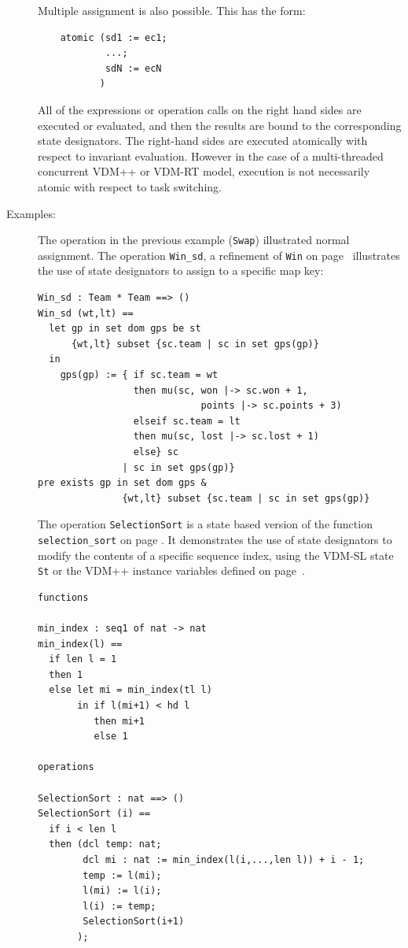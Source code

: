 \documentclass{overturerepchap}
\begin{document}
\begin{description}
  Multiple assignment is also possible. This has the form:
  \begin{lstlisting}
    atomic (sd1 := ec1;
            ...;
            sdN := ecN
           )
  \end{lstlisting}
  All of the expressions or operation calls on the right hand sides
  are executed or evaluated, and then the results are bound to the
  corresponding state designators. The right-hand sides are executed
  atomically with respect to invariant evaluation.  However in the
  case of a multi-threaded concurrent VDM++ or VDM-RT model, execution
  is not necessarily atomic with respect to task switching.

\item[Examples:] The operation in the previous example (\texttt{Swap}) 
  illustrated normal assignment. The operation \texttt{Win\_sd}, a 
  refinement of \texttt{Win} on page~\pageref{winDef} illustrates the use of 
  state designators to assign to a specific map key:
  \begin{lstlisting}
Win_sd : Team * Team ==> ()
Win_sd (wt,lt) ==
  let gp in set dom gps be st 
      {wt,lt} subset {sc.team | sc in set gps(gp)}
  in
    gps(gp) := { if sc.team = wt
                 then mu(sc, won |-> sc.won + 1,
                             points |-> sc.points + 3)
                 elseif sc.team = lt
                 then mu(sc, lost |-> sc.lost + 1)
                 else} sc 
               | sc in set gps(gp)}
pre exists gp in set dom gps & 
               {wt,lt} subset {sc.team | sc in set gps(gp)}
  \end{lstlisting}
  The operation \texttt{SelectionSort} is a state based version of the 
  function \texttt{selection\_sort} on page \pageref{selectionSortdef}. It 
  demonstrates the use of state designators to modify the contents of a 
  specific sequence index, using the VDM-SL
state \texttt{St} or the VDM++
instance variables
 defined on page~\pageref{stdef}. 
  \begin{lstlisting}
functions
 
min_index : seq1 of nat -> nat
min_index(l) ==
  if len l = 1 
  then 1
  else let mi = min_index(tl l)
       in if l(mi+1) < hd l
          then mi+1
          else 1

operations

SelectionSort : nat ==> ()
SelectionSort (i) ==
  if i < len l
  then (dcl temp: nat;
        dcl mi : nat := min_index(l(i,...,len l)) + i - 1;
        temp := l(mi);
        l(mi) := l(i);
        l(i) := temp;
        SelectionSort(i+1)
       );
  \end{lstlisting}


\end{description}
\end{document}
